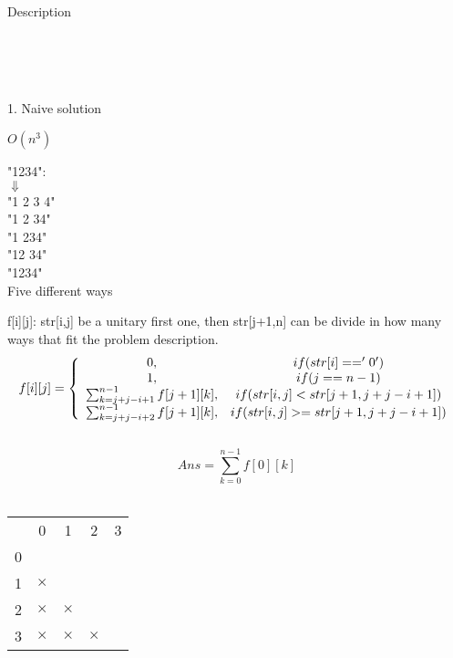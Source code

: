 \documentclass[a4paper,12pt]{article}
\begin{document}
\begin{bfseries}
Description
\end{bfseries}
\\
\\
\\
\begin{bfseries}
1. Naive solution
\end{bfseries}
$O(n^3)$ \\
\begin{center}
"1234": \\
$\Downarrow$ \\
"1 2 3 4" \\
"1 2 34" \\
"1 234" \\
"12 34" \\
"1234" \\
Five different ways \\
\end{center}
f[i][j]: str[i,j] be a unitary first one, then str[j+1,n] can be divide in how many ways that fit the problem description.\\
\[
f[i][j] =
\left\{
    \begin{array}{c c}
        0, & if (str[i]=='0') \\
        1, & if (j==n-1) \\
        \sum_{k = j+j-i+1}^{n-1} f[j+1][k], & if (str[i,j]<str[j+1,j+j-i+1]) \\
        \sum_{k = j+j-i+2}^{n-1} f[j+1][k], & if (str[i,j]>=str[j+1,j+j-i+1])
    \end{array}
\right.
\]
\\
\[
Ans = \sum_{k = 0}^{n-1} f[0][k]
\]
\\

\begin{center}
    \begin{tabular}{ r|c|c|c|c| }
        \multicolumn{1}{r}{} & \multicolumn{1}{c}{0} & \multicolumn{1}{c}{1} & \multicolumn{1}{c}{2} & \multicolumn{1}{c}{3}\\
        \cline{2-5}
        0 & \ & \ & \ & \ \\
        \cline{2-5}
        1 & $\times$ & \ & \ & \ \\
        \cline{2-5}
        2 & $\times$ & $\times$ & \ & \ \\
        \cline{2-5}
        3 & $\times$ & $\times$ & $\times$ & \ \\
        \cline{2-5}
    \end{tabular}
\end{center}
\end{document}

